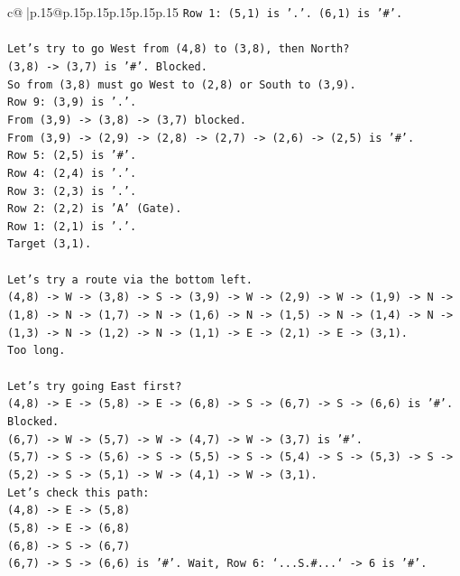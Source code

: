 \documentclass{article}
\begin{document}
{\begin{supertabular}{c@{$\;$}|p{.15\linewidth}@{}p{.15\linewidth}p{.15\linewidth}p{.15\linewidth}p{.15\linewidth}p{.15\linewidth}}
{{{\texttt{Row 1: (5,1) is '.'. (6,1) is '\#'.} \\
\\ 
\texttt{Let's try to go West from (4,8) to (3,8), then North?} \\
\texttt{(3,8) {-}> (3,7) is '\#'. Blocked.} \\
\texttt{So from (3,8) must go West to (2,8) or South to (3,9).} \\
\texttt{Row 9: (3,9) is '.'.} \\
\texttt{From (3,9) {-}> (3,8) {-}> (3,7) blocked.} \\
\texttt{From (3,9) {-}> (2,9) {-}> (2,8) {-}> (2,7) {-}> (2,6) {-}> (2,5) is '\#'.} \\
\texttt{Row 5: (2,5) is '\#'.} \\
\texttt{Row 4: (2,4) is '.'.} \\
\texttt{Row 3: (2,3) is '.'.} \\
\texttt{Row 2: (2,2) is 'A' (Gate).} \\
\texttt{Row 1: (2,1) is '.'.} \\
\texttt{Target (3,1).} \\
\\ 
\texttt{Let's try a route via the bottom left.} \\
\texttt{(4,8) {-}> W {-}> (3,8) {-}> S {-}> (3,9) {-}> W {-}> (2,9) {-}> W {-}> (1,9) {-}> N {-}> (1,8) {-}> N {-}> (1,7) {-}> N {-}> (1,6) {-}> N {-}> (1,5) {-}> N {-}> (1,4) {-}> N {-}> (1,3) {-}> N {-}> (1,2) {-}> N {-}> (1,1) {-}> E {-}> (2,1) {-}> E {-}> (3,1).} \\
\texttt{Too long.} \\
\\ 
\texttt{Let's try going East first?} \\
\texttt{(4,8) {-}> E {-}> (5,8) {-}> E {-}> (6,8) {-}> S {-}> (6,7) {-}> S {-}> (6,6) is '\#'. Blocked.} \\
\texttt{(6,7) {-}> W {-}> (5,7) {-}> W {-}> (4,7) {-}> W {-}> (3,7) is '\#'.} \\
\texttt{(5,7) {-}> S {-}> (5,6) {-}> S {-}> (5,5) {-}> S {-}> (5,4) {-}> S {-}> (5,3) {-}> S {-}> (5,2) {-}> S {-}> (5,1) {-}> W {-}> (4,1) {-}> W {-}> (3,1).} \\
\texttt{Let's check this path:} \\
\texttt{(4,8) {-}> E {-}> (5,8)} \\
\texttt{(5,8) {-}> E {-}> (6,8)} \\
\texttt{(6,8) {-}> S {-}> (6,7)} \\
\texttt{(6,7) {-}> S {-}> (6,6) is '\#'. Wait, Row 6: `...S.\#...` {-}> 6 is '\#'.} \\
}}}
\end{supertabular}}
\end{document}

